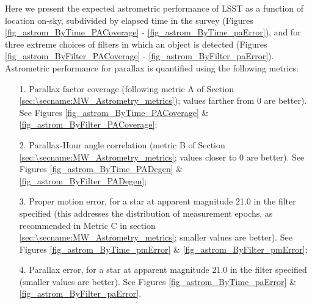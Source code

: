 Here we present the expected astrometric performance of LSST as a function of
location on-sky, subdivided by elapsed time in the survey (Figures \ref{fig_astrom_ByTime_PACoverage} -  \ref{fig_astrom_ByTime_paError}), and for three extreme choices of filters in which an object is detected (Figures \ref{fig_astrom_ByFilter_PACoverage} -  \ref{fig_astrom_ByFilter_paError}). Astrometric performance for parallax is quantified using the following metrics:
\begin{itemize}
  \item[1.] Parallax factor coverage (following metric A of Section \ref{sec:\secname:MW_Astrometry_metrics}); values farther from 0 are better). See Figures \ref{fig_astrom_ByTime_PACoverage} \&  \ref{fig_astrom_ByFilter_PACoverage};
    \item[2.] Parallax-Hour angle correlation (metric B of Section \ref{sec:\secname:MW_Astrometry_metrics}; values closer to 0 are better). See Figures \ref{fig_astrom_ByTime_PADegen} \& \ref{fig_astrom_ByFilter_PADegen};
      \item[3.] Proper motion error, for a star at apparent magnitude 21.0 in the filter specified (this addresses the distribution of measurement epochs, as recommended in Metric C in section \ref{sec:\secname:MW_Astrometry_metrics}; smaller values are better). See Figures \ref{fig_astrom_ByTime_pmError} \& \ref{fig_astrom_ByFilter_pmError};
        \item[4.] Parallax error, for a star at apparent magnitude 21.0 in the filter specified (smaller values are better). See Figures \ref{fig_astrom_ByTime_paError} \& \ref{fig_astrom_ByFilter_paError}.
\end{itemize}

